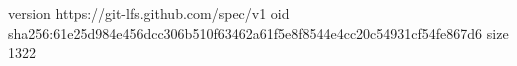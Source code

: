 version https://git-lfs.github.com/spec/v1
oid sha256:61e25d984e456dcc306b510f63462a61f5e8f8544e4cc20c54931cf54fe867d6
size 1322
